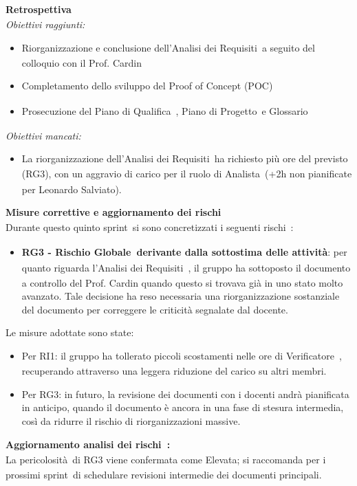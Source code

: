 \documentclass[a4paper,12pt]{article}
\newcommand{\pediceG}{\texorpdfstring{\textsubscript{\scalebox{0.6}{\textbf{G}}}~}{G}}
\begin{document}
\noindent\textbf{Retrospettiva\pediceG}\\
\textit{Obiettivi raggiunti:}
\begin{itemize}
    \item Riorganizzazione e conclusione dell'Analisi dei Requisiti\pediceG a seguito del colloquio con il Prof. Cardin
    \item Completamento dello sviluppo del Proof of Concept (POC)\pediceG
    \item Prosecuzione del Piano di Qualifica\pediceG, Piano di Progetto\pediceG e Glossario\pediceG
\end{itemize}
\textit{Obiettivi mancati:}
\begin{itemize}
    \item La riorganizzazione dell'Analisi dei Requisiti\pediceG ha richiesto più ore del previsto (RG3), con un aggravio di carico per il ruolo di Analista\pediceG (+2h non pianificate per Leonardo Salviato).
\end{itemize}

\noindent\textbf{Misure correttive e aggiornamento dei rischi\pediceG}\\
Durante questo quinto sprint\pediceG si sono concretizzati i seguenti rischi\pediceG:

\begin{itemize}
   \item \textbf{RG3 - Rischio Globale\pediceG derivante dalla sottostima delle attività}: per quanto riguarda l'Analisi dei Requisiti\pediceG, il gruppo ha sottoposto il documento a controllo del Prof. Cardin quando questo si trovava già in uno stato molto avanzato. Tale decisione ha reso necessaria una riorganizzazione sostanziale del documento per correggere le criticità segnalate dal docente.
\end{itemize}

Le misure adottate sono state:
\begin{itemize}
    \item Per RI1: il gruppo ha tollerato piccoli scostamenti nelle ore di Verificatore\pediceG, recuperando attraverso una leggera riduzione del carico su altri membri.
    \item Per RG3: in futuro, la revisione dei documenti con i docenti andrà pianificata in anticipo, quando il documento è ancora in una fase di stesura intermedia, così da ridurre il rischio di riorganizzazioni massive.
\end{itemize}

\textbf{Aggiornamento analisi dei rischi\pediceG:}\\ La pericolosità\pediceG di RG3 viene confermata come Elevata; si raccomanda per i prossimi sprint\pediceG di schedulare revisioni intermedie dei documenti principali.
\end{document}
